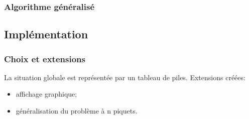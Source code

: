 \documentclass{beamer}%
\begin{document}
			\begin{frame}
				\frametitle{Algorithme généralisé}
				\begin{figure}
					\centering
					\setcounter{subfigure}{0}
					\qquad
				\end{figure}	
				\begin{figure}
					\centering
					\qquad
				\end{figure}
			\end{frame}
			
		\subsection{Implémentation}
			\begin{frame}
				\frametitle{Choix et extensions}
				La situation globale est représentée par un tableau de piles.
				\bigbreak
				Extensions créées:
				\begin{itemize}
					\item affichage graphique;
					\item généralisation du problème à n piquets.
				\end{itemize}
			\end{frame}
			
\end{document}
